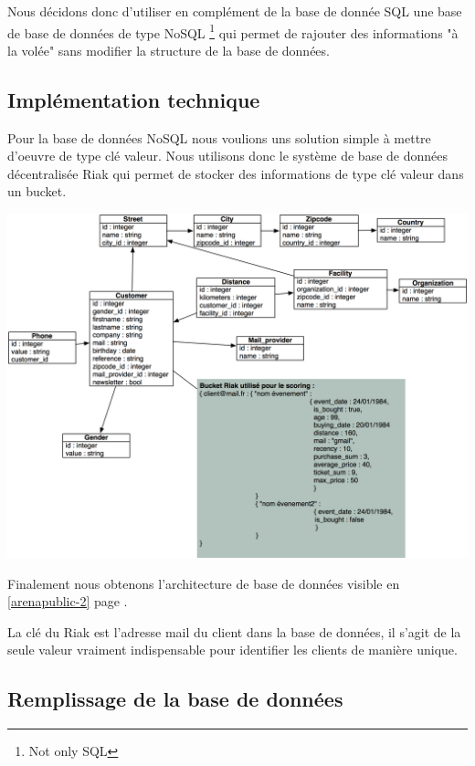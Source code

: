 Nous décidons donc d'utiliser en complément de la base de donnée SQL une base de base de données de type NoSQL \footnote{Not only SQL} qui permet de rajouter des informations "à la volée" sans modifier la structure de la base de données. 

\subsection{Implémentation technique}
Pour la base de données NoSQL nous voulions uns solution simple à mettre d’oeuvre de type clé valeur. Nous utilisons donc le système de base de données décentralisée Riak qui permet de stocker des informations de type clé valeur dans un bucket.

\begin{center}
\includegraphics[scale=0.62]{images/arenapublic-2.png}
\label{arenapublic-2}
\end{center}

Finalement nous obtenons l'architecture de base de données visible en \ref{arenapublic-2} page \pageref{arenapublic-2}.

La clé du Riak est l'adresse mail du client dans la base de données, il s'agit de la seule valeur vraiment indispensable pour identifier les clients de manière unique.

\subsection{Remplissage de la base de données}

